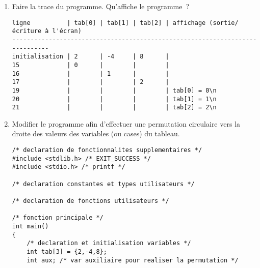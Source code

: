 \begin{enumerate}
\begin{listing}{1}
/* definitions des fonctions utilisateurs */
\end{listing}
  \begin{correction}
    Le programme :
    \begin{itemize}
    \item déclare et initialise un tableau, s'appelant \verb|tab|, de 3 variables entières avec les valeurs suivantes : 2,-4 et 8;
    \item affecte 0 à la variable d'indice 0, tab[0];
    \item affecte 1 à la variable d'indice 1, tab[1];
    \item affecte 2 à la variable d'indice 2, tab[2];
    \item affiche les valeurs des variables du tableau; par abus de langage, on parle de cases d'un tableau.
    \end{itemize}
  \end{correction}
\item Faire la trace du programme. Qu'affiche le programme~?
\begin{correction}
\begin{verbatim}
ligne          | tab[0] | tab[1] | tab[2] | affichage (sortie/écriture à l'écran)
-----------------------------------------------------------------------------
initialisation | 2      | -4     | 8      |
15             | 0      |        |        |
16             |        | 1      |        |
17             |        |        | 2      |
19             |        |        |        | tab[0] = 0\n
20             |        |        |        | tab[1] = 1\n
21             |        |        |        | tab[2] = 2\n
\end{verbatim}
\end{correction}

\item Modifier le programme afin d'effectuer une permutation circulaire vers la droite des valeurs des variables (ou cases) du tableau.
  \begin{correction}
   \begin{verbatim}
/* declaration de fonctionnalites supplementaires */
#include <stdlib.h> /* EXIT_SUCCESS */
#include <stdio.h> /* printf */

/* declaration constantes et types utilisateurs */

/* declaration de fonctions utilisateurs */

/* fonction principale */
int main()
{
    /* declaration et initialisation variables */
    int tab[3] = {2,-4,8};
    int aux; /* var auxiliaire pour realiser la permutation */


\end{verbatim}
\end{correction}
\end{enumerate}
